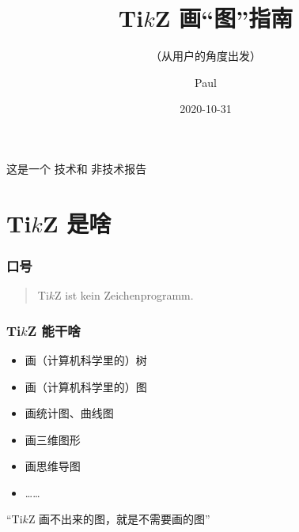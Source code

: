 \documentclass[usenames,xcolor=svgnames,11pt,sans,handout]{beamer}
\newcommand{\key}[1]{{\color{theme} #1}}
\begin{document}
\title{Ti$k$Z 画“图”指南}
\subtitle{（从用户的角度出发）}
\author{Paul}
\date{2020-10-31}



\begin{frame}
    \titlepage
\end{frame}

\begin{frame}
    \begin{center}\Large
        这是一个\key{技术}和\key{非技术}报告
    \end{center}
\end{frame}

\section{Ti$k$Z 是啥}

\begin{frame}
    \frametitle{口号}

    \begin{quote}\Large
        Ti$k$Z ist kein Zeichenprogramm.

    \end{quote}
\end{frame}

\begin{frame}
    \frametitle{Ti$k$Z 能干啥}

    \begin{itemize}
        \item 画（计算机科学里的）树
        \item 画（计算机科学里的）图
        \item 画统计图、曲线图
        \item 画三维图形
        \item 画思维导图
        \item ……
    \end{itemize}

    \pause
    \vspace{20pt}
    \begin{center}\Large\color{theme}
        “Ti$k$Z 画不出来的图，就是不需要画的图”
    \end{center}
\end{frame}
\end{document}
